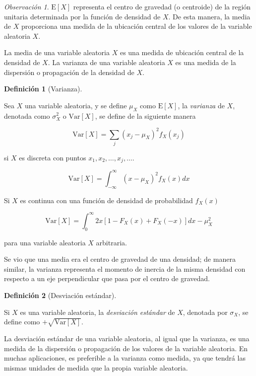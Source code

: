 \documentclass[
  us-letterpaper,
]{scrreprt}
\theoremstyle{plain}
\theoremstyle{definition}
\theoremstyle{plain}
\theoremstyle{definition}
\newtheorem{definition}{Definición}[chapter]
\theoremstyle{remark}
\newtheorem*{remark}{Observación}
\begin{document}
\begin{remark}
\(\mathrm E[X]\) representa el centro de gravedad (o centroide) de la
región unitaria determinada por la función de densidad de \(X\). De esta
manera, la media de \(X\) proporciona una medida de la ubicación central
de los valores de la variable aleatoria \(X\).
\end{remark}

La media de una variable aleatoria \(X\) es una medida de ubicación
central de la densidad de \(X\). La varianza de una variable aleatoria
\(X\) es una medida de la dispersión o propagación de la densidad de
\(X\).

\begin{definition}[Varianza]\protect\hypertarget{def-var}{}\label{def-var}

Sea \(X\) una variable aleatoria, y se define \(\mu_X\) como
\(\mathrm E[X]\), la \emph{varianza} de \(X\), denotada como
\(\sigma_X^2\) o \(\mathrm{Var}[X]\), se define de la siguiente manera

\[ \mathrm{Var}[X]= \sum_j (x_j-\mu_X)^2 f_X(x_j) \]

si \(X\) es discreta con puntos \(x_1, x_2, \ldots, x_j, \ldots\).

\[ \mathrm{Var}[X]=\int_{-\infty}^\infty (x-\mu_X)^2f_X(x)dx \]

Si \(X\) es continua con una función de densidad de probabilidad
\(f_X(x)\)

\[ \mathrm{Var}[X]=\int_0^\infty 2x[1-F_X(x)+F_X(-x)]dx - \mu_X^2 \]

para una variable aleatoria \(X\) arbitraria.

\end{definition}

Se vio que una media era el centro de gravedad de una densidad; de
manera similar, la varianza representa el momento de inercia de la misma
densidad con respecto a un eje perpendicular que pasa por el centro de
gravedad.

\begin{definition}[Desviación
estándar]\protect\hypertarget{def-SD}{}\label{def-SD}

Si \(X\) es una variable aleatoria, la \emph{desviación estándar} de
\(X\), denotada por \(\sigma_X\), se define como
\(+\sqrt{\mathrm{Var}[X]}\).

\end{definition}

La desviación estándar de una variable aleatoria, al igual que la
varianza, es una medida de la dispersión o propagación de los valores de
la variable aleatoria. En muchas aplicaciones, es preferible a la
varianza como medida, ya que tendrá las mismas unidades de medida que la
propia variable aleatoria.
\end{document}
